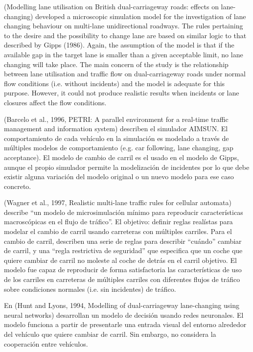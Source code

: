 (Modelling lane utilisation on British dual-carriageway roads: effects on lane-changing) developed a microscopic simulation model for the investigation of lane changing behaviour on multi-lane unidirectional roadways. The rules pertaining to the desire and the possibility to change lane are based on similar logic to that described by Gipps (1986). Again, the assumption of the model is that if the available gap in the target lane is smaller than a given acceptable limit, no lane changing will take place. The main concern of the study is the relationship between lane utilisation and traffic flow on dual-carriageway roads under normal flow conditions (i.e. without incidents) and the model is adequate for this purpose. However, it could not produce realistic results when incidents or lane closures affect the flow conditions.

(Barcelo et al., 1996, PETRI: A parallel environment for a real-time traffic management and information system) describen el simulador AIMSUN. El comportamiento de cada vehículo en la simulación es modelado a través de múltiples modelos de comportamiento (e.g. car following, lane changing, gap acceptance). El modelo de cambio de carril es el usado en el modelo de Gipps, aunque el propio simulador permite la modelización de incidentes por lo que debe existir alguna variación del modelo original o un nuevo modelo para ese caso concreto.

(Wagner et al., 1997, Realistic multi-lane traffic rules for cellular automata) describe \enquote{un modelo de microsimulación mínimo para reproducir características macroscópicas en el flujo de tráfico}. El objetivo: definir reglas realístas para modelar el cambio de carril usando carreteras con múltiples carriles. Para el cambio de carril, describen una serie de reglas para describir \enquote{cuándo} cambiar de carril, y una \enquote{regla restrictiva de seguridad} que especifica que un coche que quiere cambiar de carril no moleste al coche de detrás en el carril objetivo. El modelo fue capaz de reproducir de forma satisfactoria las características de uso de los carriles en carreteras de múltiples carriles con diferentes flujos de tráfico sobre condiciones normales (i.e. sin incidentes) de tráfico.

En (Hunt and Lyons, 1994, Modelling of dual-carriageway lane-changing using neural networks) desarrollan un modelo de decisión usando redes neuronales. El modelo funciona a partir de presentarle una entrada visual del entorno alrededor del vehículo que quiere cambiar de carril. Sin embargo, no considera la cooperación entre vehículos.

